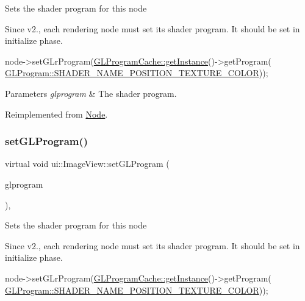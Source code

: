 Sets the shader program for this node

Since v2., each rendering node must set its shader program. It should be set in initialize phase. 
\begin{DoxyCode}
node->setGLrProgram(\hyperlink{classGLProgramCache_a084359da301355ed6c32b12689669d37}{GLProgramCache::getInstance}()->getProgram(
      \hyperlink{classGLProgram_a7f7e223328336e8792add8633171aa96}{GLProgram::SHADER\_NAME\_POSITION\_TEXTURE\_COLOR}));
\end{DoxyCode}



\begin{DoxyParams}{Parameters}
{\em glprogram} & The shader program. \\
\hline
\end{DoxyParams}


Reimplemented from \hyperlink{classNode_a16ac830f1b38ae931da062c0833b2db0}{Node}.

\mbox{\label{classui_1_1ImageView_adf4dee6b3cee1d981f2a671dcef2ce7a}} 
\subsubsection{\texorpdfstring{set\+G\+L\+Program()}{setGLProgram()}\hspace{0.1cm}{\footnotesize\ttfamily [2/2]}}
{\footnotesize\ttfamily virtual void ui\+::\+Image\+View\+::set\+G\+L\+Program (\begin{DoxyParamCaption}\item[{\hyperlink{classGLProgram}{G\+L\+Program} $\ast$}]{glprogram }\end{DoxyParamCaption})\hspace{0.3cm}{\ttfamily [override]}, {\ttfamily [virtual]}}

Sets the shader program for this node

Since v2., each rendering node must set its shader program. It should be set in initialize phase. 
\begin{DoxyCode}
node->setGLrProgram(\hyperlink{classGLProgramCache_a084359da301355ed6c32b12689669d37}{GLProgramCache::getInstance}()->getProgram(
      \hyperlink{classGLProgram_a7f7e223328336e8792add8633171aa96}{GLProgram::SHADER\_NAME\_POSITION\_TEXTURE\_COLOR}));
\end{DoxyCode}



